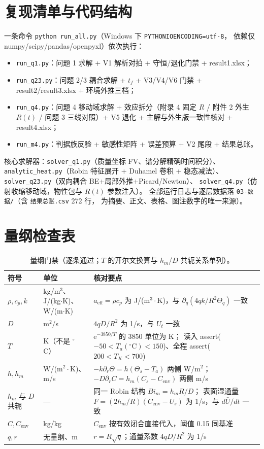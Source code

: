 \documentclass[12pt,a4paper]{ctexart}
\numberwithin{equation}{section}
\begin{document}
\section{复现清单与代码结构}\label{app:代码}
一条命令 \texttt{python run\_all.py}（Windows 下 \texttt{PYTHONIOENCODING=utf-8}，
依赖仅 numpy/scipy/pandas/openpyxl）依次执行：
\begin{itemize}
  \item \texttt{run\_q1.py}：问题 1 求解 + V1 解析对拍 + 守恒/退化门禁 + result1.xlsx；
  \item \texttt{run\_q23.py}：问题 2/3 耦合求解 + $t_f$ + V3/V4/V6 门禁 +
        result2/result3.xlsx + 环境外推三档；
  \item \texttt{run\_q4.py}：问题 4 移动域求解 + 效应拆分（附录 4 固定 $R$ / 附件 2 外生 $R(t)$ /
        问题 3 三线对照）+ V5 退化 + 主解与外生版一致性核对 + result4.xlsx；
  \item \texttt{run\_m4.py}：判据族反验 + 敏感性矩阵 + 误差预算 + V2 尾段 + 结果总账。
\end{itemize}
核心求解器：\texttt{solver\_q1.py}（质量坐标 FV、谱分解精确时间积分）、
\texttt{analytic\_heat.py}（Robin 特征展开 + Duhamel 卷积 + 稳态减法）、
\texttt{solver\_q23.py}（双向耦合 BE+局部外推+Picard/Newton）、
\texttt{solver\_q4.py}（仿射收缩移动域，物性包与 $R(t)$ 参数注入）。
全部运行日志与逐层数据落 \texttt{03-数据/}（含 \texttt{结果总账.csv} 272 行，
为摘要、正文、表格、图注数字的唯一来源）。

\section{量纲检查表}\label{app:量纲}
\begin{table}[htbp]
\centering
\caption{量纲门禁（逐条通过；$T$ 的开尔文换算与 $h_m$/$D$ 共轭关系单列）。}
\label{tab:量纲}
\small
\begin{tabular}{>{\raggedright\arraybackslash}p{2.40cm}>{\raggedright\arraybackslash}p{3.60cm}>{\raggedright\arraybackslash}p{8.60cm}}
\toprule
符号 & 单位 & 核对要点 \\
\midrule
$\rho,c_p,k$ & kg/m$^3$、J/(kg$\cdot$K)、W/(m$\cdot$K) &
$a_{\mathrm{eff}}=\rho c_p$ 为 J/(m$^3\cdot$K)，与 $\partial_q(4qk/R^2\varTheta_q)$ 一致 \\
$D$ & m$^2$/s & $4qD/R^2$ 为 1/s，与 $U_t$ 一致 \\
$T$ & K（不是 ${}^\circ$C） & $\mathrm{e}^{-3850/T}$ 的 3850 单位为 K；
读入 assert($-50<T_a(^{\circ}\mathrm{C})<150$)、全程 assert($200<T_K<700$) \\
$h,h_m$ & W/(m$^2\cdot$K)、m/s &
$-k\partial_r\varTheta=h(\varTheta_s-T_a)$ 两侧 W/m$^2$；
$-D\partial_rC=h_m(C_s-C_{\mathrm{env}})$ 两侧 m/s \\
$h_m$ 与 $D$ 共轭 & — & 同一 Robin 结构 $Bi_m=h_mR/D$；
表面湿通量 $F=(2h_m/R)(C_{\mathrm{env}}-U_s)$ 为 1/s，与 $d\bar U/dt$ 一致 \\
$C,C_{\mathrm{env}}$ & kg/kg & $C_{\mathrm{env}}$ 按有效闭合直接代入，阈值 0.15 同基准 \\
$q,r$ & 无量纲、m & $r=R\sqrt q$；通量系数 $4qD/R^2$ 为 1/s \\
\bottomrule
\end{tabular}
\end{table}
\end{document}
